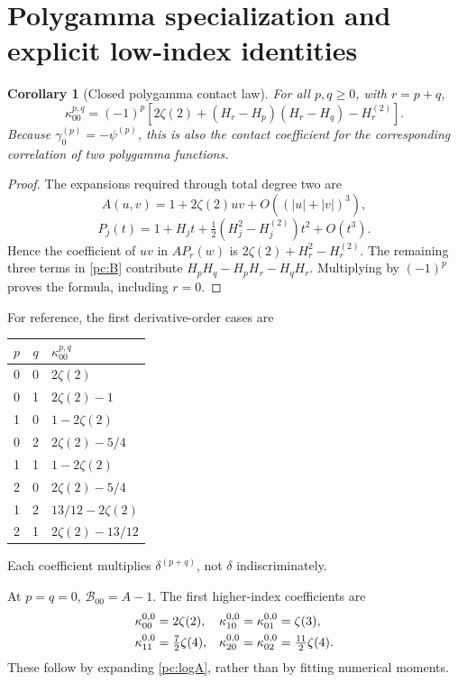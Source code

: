\documentclass[11pt,a4paper]{article}
\numberwithin{equation}{section}
\newtheorem{corollary}[theorem]{Corollary}
\theoremstyle{definition}
\newcommand{\BF}{\mathcal B}
\begin{document}
\section{Polygamma specialization and explicit low-index identities}\label{pc:examples}
\begin{corollary}[Closed polygamma contact law]\label{pc:poly-contact}
For all $p,q\ge0$, with $r=p+q$,
\begin{equation}\label{pc:poly-kappa}
\boxed{\quad
\kappa_{00}^{p,q}=(-1)^p\left[
2\zeta(2)+(H_r-H_p)(H_r-H_q)-H_r^{(2)}
\right].\quad}
\end{equation}
Because $\gamma_0^{(p)}=-\psi^{(p)}$, this is also the contact coefficient for the corresponding correlation of two polygamma functions.
\end{corollary}
\begin{proof}
The expansions required through total degree two are
\[
A(u,v)=1+2\zeta(2)uv+O((|u|+|v|)^3),
\]
\[
P_j(t)=1+H_jt+\tfrac12(H_j^2-H_j^{(2)})t^2+O(t^3).
\]
Hence the coefficient of $uv$ in $A P_r(w)$ is
$2\zeta(2)+H_r^2-H_r^{(2)}$. The remaining three terms in \eqref{pc:B} contribute $H_pH_q-H_pH_r-H_qH_r$. Multiplying by $(-1)^p$ proves the formula, including $r=0$.
\end{proof}
For reference, the first derivative-order cases are
\begin{center}
\begin{tabular}{@{}ccl@{}}
\toprule
$p$ & $q$ & $\kappa_{00}^{p,q}$\\
\midrule
0&0&$2\zeta(2)$\\
0&1&$2\zeta(2)-1$\\
1&0&$1-2\zeta(2)$\\
0&2&$2\zeta(2)-5/4$\\
1&1&$1-2\zeta(2)$\\
2&0&$2\zeta(2)-5/4$\\
1&2&$13/12-2\zeta(2)$\\
2&1&$2\zeta(2)-13/12$\\
\bottomrule
\end{tabular}
\end{center}
Each coefficient multiplies $\delta^{(p+q)}$, not $\delta$ indiscriminately.

At $p=q=0$, $\BF_{00}=A-1$. The first higher-index coefficients are
\begin{align}
\kappa_{00}^{0,0}&=2\zeta(2),&
\kappa_{10}^{0,0}=\kappa_{01}^{0,0}&=\zeta(3),\label{pc:smallkappa}\\
\kappa_{11}^{0,0}&=\tfrac72\zeta(4),&
\kappa_{20}^{0,0}=\kappa_{02}^{0,0}&=\tfrac{11}2\zeta(4).\notag
\end{align}
These follow by expanding \eqref{pc:logA}, rather than by fitting numerical moments.
\end{document}
